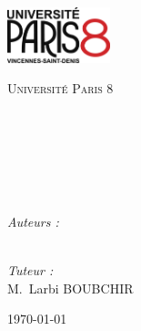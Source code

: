 \begin{titlepage}

\begin{center}

\begin{minipage}[t]{0.48\textwidth}
  \begin{flushleft}
    \includegraphics [width=30mm]{logop8.png} \\[0.5cm]
    \begin{spacing}{1.5}
      \textsc{Université Paris 8}
    \end{spacing}
  \end{flushleft}
\end{minipage}
\begin{minipage}[t]{0.48\textwidth}
  \begin{flushright}
  \end{flushright}
\end{minipage} \\[1.5cm]

\textsc{\Large \reportsubject}\\[0.5cm]
\HRule \\[0.4cm]
{\huge \bfseries \reporttitle}\\[0.4cm]
\HRule \\[1.5cm]

\begin{minipage}[t]{0.3\textwidth}
  \begin{flushleft} \large
    \emph{Auteurs :}\\
    \reportauthora\\
    \reportauthorb
  \end{flushleft}
\end{minipage}
\begin{minipage}[t]{0.6\textwidth}
  \begin{flushright} \large
    \emph{Tuteur :} \\
    M.~Larbi \textsc{BOUBCHIR} \\
  \end{flushright}
\end{minipage}

\vfill

{\large \today}

\end{center}

\end{titlepage}

